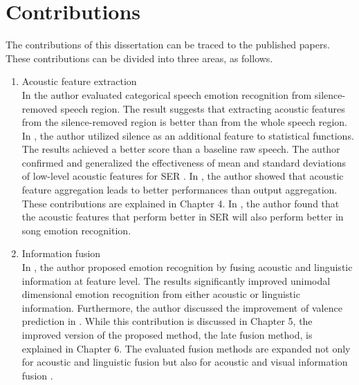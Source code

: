 \section{Contributions}
The contributions of this dissertation can be traced to the published papers.
These contributions can be divided into three areas, as follows.
\begin{enumerate}
\item Acoustic feature extraction \\
In \cite{Atmaja2019} the author evaluated categorical speech emotion
recognition from silence-removed speech region. The result suggests that
extracting acoustic features from the silence-removed region is better than
from the whole speech region. In \cite{Atmaja2020f}, the author utilized
silence as an additional feature to statistical functions. The results achieved
a better score than a baseline raw speech. The author confirmed and generalized
the effectiveness of mean and standard deviations of low-level acoustic
features for SER \cite{Atmaja2020f, Atmaja2020d}. In \cite{Atmaja2020h}, the
author showed that acoustic feature aggregation leads to better performances
than output aggregation. These contributions are explained in Chapter 4. In
\cite{Atmaja2020j}, the author found that the acoustic features that perform
better in SER will also perform better in song emotion recognition.

\item Information fusion \\
In \cite{Atmaja2019b, Atmaja2020d, Atmaja2020h}, the author proposed emotion
recognition by fusing acoustic and linguistic information at feature level. The
results significantly improved unimodal dimensional emotion recognition from
either acoustic or linguistic information. Furthermore, the author discussed the
improvement of valence prediction in \cite{Atmaja2020e}. While this
contribution is discussed in Chapter 5, the improved version of the proposed
method, the late fusion method, is explained in Chapter 6. The evaluated fusion
methods are expanded not only for acoustic and linguistic fusion but also for
acoustic and visual information fusion \cite{Atmaja2020, Elbarougy2020}. 


\end{enumerate}
